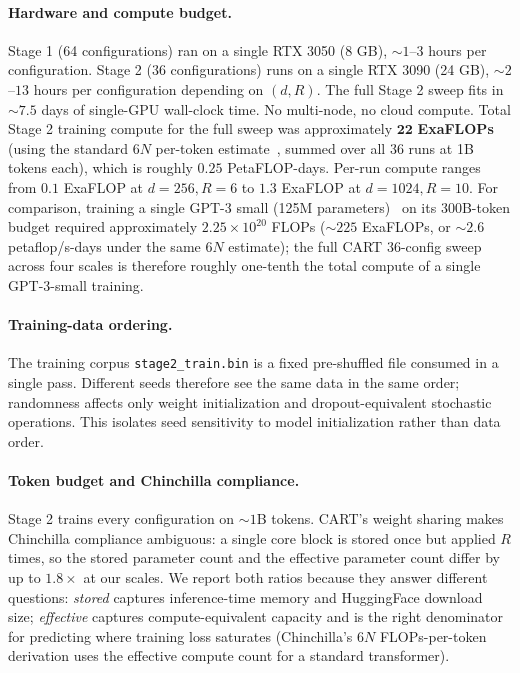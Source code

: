\documentclass{article}
\newcommand{\cart}{\textsc{CART}}
\begin{document}
\paragraph{Hardware and compute budget.} Stage 1 (64 configurations) ran on a single RTX 3050 (8 GB), $\sim 1$--$3$ hours per configuration. Stage 2 (36 configurations) runs on a single RTX 3090 (24 GB), $\sim 2$--$13$ hours per configuration depending on $(d, R)$. The full Stage 2 sweep fits in $\sim 7.5$ days of single-GPU wall-clock time. No multi-node, no cloud compute. Total Stage 2 training compute for the full sweep was approximately $\mathbf{22}$ \textbf{ExaFLOPs} (using the standard $6N$ per-token estimate~\citep{kaplan2020scaling}, summed over all 36 runs at 1B tokens each), which is roughly $0.25$ PetaFLOP-days. Per-run compute ranges from $0.1$ ExaFLOP at $d{=}256, R{=}6$ to $1.3$ ExaFLOP at $d{=}1024, R{=}10$. For comparison, training a single GPT-3 small (125M parameters)~\citep{brown2020gpt3} on its 300B-token budget required approximately $2.25 \times 10^{20}$ FLOPs ($\sim 225$ ExaFLOPs, or $\sim 2.6$ petaflop/s-days under the same $6N$ estimate); the full \cart{} 36-config sweep across four scales is therefore roughly one-tenth the total compute of a single GPT-3-small training.

\paragraph{Training-data ordering.} The training corpus \texttt{stage2\_train.bin} is a fixed pre-shuffled file consumed in a single pass. Different seeds therefore see the same data in the same order; randomness affects only weight initialization and dropout-equivalent stochastic operations. This isolates seed sensitivity to model initialization rather than data order.

\paragraph{Token budget and Chinchilla compliance.} Stage 2 trains every configuration on $\sim 1$B tokens. \cart{}'s weight sharing makes Chinchilla compliance ambiguous: a single core block is stored once but applied $R$ times, so the stored parameter count and the effective parameter count differ by up to $1.8\times$ at our scales. We report both ratios because they answer different questions: \emph{stored} captures inference-time memory and HuggingFace download size; \emph{effective} captures compute-equivalent capacity and is the right denominator for predicting where training loss saturates (Chinchilla's $6N$ FLOPs-per-token derivation uses the effective compute count for a standard transformer).
\end{document}

